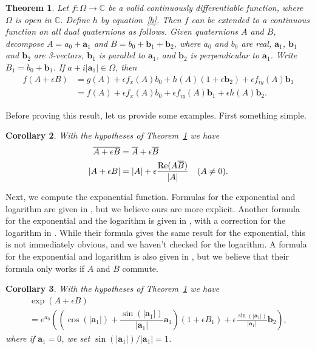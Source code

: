 \documentclass[12pt,reqno]{amsart}
\newtheorem{theorem}{Theorem}
\newtheorem{cor}[theorem]{Corollary}
\begin{document}
\begin{theorem}
\label{f(dq)}
Let $f:\Omega \to \mathbb C$ be a valid continuously differentiable function, where $\Omega$ is open in $\mathbb C$.  Define $h$ by equation~\eqref{h}.  Then $f$ can be extended to a continuous function on all dual quaternions as follows.  Given quaternions $A$ and $B$, decompose $A = a_0 + \bm a_1$ and $B = b_0 + \bm b_1 + \bm b_2$, where $a_0$ and $b_0$ are real, $\bm a_1$, $\bm b_1$ and $\bm b_2$ are 3-vectors, $\bm b_1$ is parallel to $\bm a_1$, and $\bm b_2$ is perpendicular to $\bm a_1$.  Write $B_1 = b_0 + \bm b_1$.  If $a + i |\bm a_1| \in \Omega$, then
\begin{align}
f(A + \epsilon B)
&= g(A) 
+ \epsilon f_x(A) b_0
+ h(A) (1 + \epsilon \bm b_2)
+ \epsilon f_{iy}(A) \bm b_1 \\
&= f(A) 
+ \epsilon f_x(A) b_0
+ \epsilon f_{iy}(A) \bm b_1
+ \epsilon h(A) \bm b_2 .
\end{align}
\end{theorem}

Before proving this result, let us provide some examples.  First something simple.

\begin{cor}
With the hypotheses of Theorem~\ref{f(dq)} we have
\begin{align}
\overline{A + \epsilon B} &= \overline{A} + \epsilon \overline{B} \\
|A + \epsilon B| &= |A| + \epsilon \frac{\text{\rm Re}(A \overline B)}{|A|} \quad (A \ne 0) .
\end{align}
\end{cor}

Next, we compute the exponential function.  Formulas for the exponential and logarithm are given in \cite{wang-et-al}, but we believe ours are more explicit.  Another formula for the exponential and the logarithm is given in \cite{selig}, with a correction for the logarithm in \cite{wu-et-al}.  While their formula gives the same result for the exponential, this is not immediately obvious, and we haven't checked for the logarithm.  A formula for the exponential and logarithm is also given in \cite{han-et-al}, but we believe that their formula only works if $A$ and $B$ commute.

\begin{cor}
\label{exp dq}
With the hypotheses of Theorem~\ref{f(dq)} we have
\begin{multline}
\label{exp theta}
\exp(A + \epsilon B ) \\
= e^{a_0} \left(\left(\cos(|\bm a_1|) + \dfrac{\sin(|\bm a_1|)}{|\bm a_1|} \bm a_1 \right) \left(1 + \epsilon B_1\right) + \epsilon\frac{\sin(|\bm a_1|)}{|\bm a_1|} \bm b_2\right),
\end{multline}
where if $\bm a_1 = 0$, we set $\sin(|\bm a_1|)/|\bm a_1| = 1$.
\end{cor}
\end{document}

